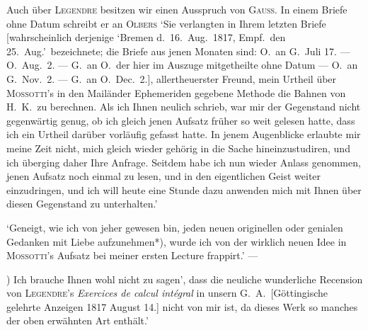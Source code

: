 \documentclass[12pt,a4paper]{article}
\begin{document}
Auch \"uber \textsc{Legendre} besitzen wir einen Ausspruch von \textsc{Gau\ss}. In einem Briefe ohne Datum schreibt
er an \textsc{Olbers} `Sie verlangten in Ihrem letzten Briefe [wahrscheinlich derjenige `Bremen d.\ 16.\ Aug.\ 1817,\linebreak
\hspace*{\fill} Empf.\ den 25.\ Aug.'\ bezeichnete; die Briefe aus jenen Monaten sind: O.\ an G.\ Juli 17. ---\linebreak
\hspace*{\fill} O.\ Aug.\ 2. --- G.\ an O.\ der hier im Auszuge mitgetheilte ohne Datum --- O.\ an G.\ Nov.\ 2. ---\linebreak
\hspace*{\fill} G.\ an O.\ Dec.\ 2.], allertheuerster Freund, mein Urtheil \"uber \textsc{Mossotti}'s in den Mail\"ander Ephemeriden gegebene Methode die Bahnen von H.\ K.\ zu berechnen. Als ich Ihnen neulich schrieb, war mir der Gegenstand nicht gegenw\"artig genug, ob ich gleich jenen Aufsatz fr\"uher so weit gelesen hatte, dass ich ein Urtheil dar\"uber vorl\"aufig gefasst hatte. In jenem Augenblicke erlaubte mir meine Zeit nicht, mich gleich wieder geh\"orig in die Sache hineinzustudiren, und ich \"uberging daher Ihre Anfrage. Seitdem habe ich nun wieder Anlass genommen, jenen Aufsatz noch einmal zu lesen, und in den eigentlichen Geist weiter einzudringen, und ich will heute eine Stunde dazu anwenden mich mit Ihnen \"uber diesen Gegenstand zu unterhalten.'

`Geneigt, wie ich von jeher gewesen bin, jeden neuen originellen oder genialen Gedanken mit
Liebe aufzunehmen*), wurde ich von der wirklich neuen Idee in \textsc{Mossotti}'s Aufsatz bei meiner ersten
Lecture frappirt.' ---

\vspace{0.5em}
{\small *) Ich brauche Ihnen wohl nicht zu sagen', dass die neuliche wunderliche Recension von \textsc{Legendre}'s
\textit{Exercices de calcul int\'egral} in unsern G.\ A.\ [G\"ottingische gelehrte Anzeigen 1817 August 14.] nicht von
mir ist, da dieses Werk so manches der oben erw\"ahnten Art enth\"alt.'}

\vspace{1em}
\end{document}
